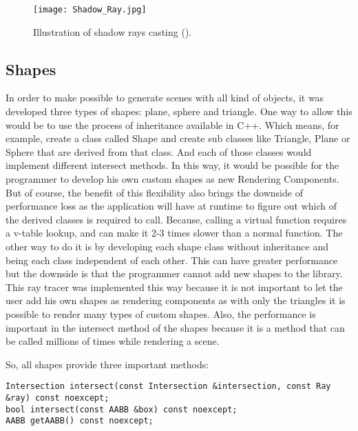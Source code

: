\begin{figure}[H]
	\centering
	\caption{Illustration of shadow rays casting (\cite{ShadowRays}).}
	\label{Illustration of shadow rays casting.}
	\texttt{[image: Shadow\_Ray.jpg]}
\end{figure}


\subsection{Shapes}

\par
In order to make possible to generate scenes with all kind of objects, it was developed three types of shapes: plane, sphere and triangle.
One way to allow this would be to use the process of inheritance available in C++.
Which means, for example, create a class called Shape and create sub classes like Triangle, Plane or Sphere that are derived from that class.
And each of those classes would implement different intersect methods.
In this way, it would be possible for the programmer to develop his own custom shapes as new Rendering Components.
But of course, the benefit of this flexibility also brings the downside of performance loss as the application will have at runtime to figure out which of the derived classes is required to call.
Because, calling a virtual function requires a v-table lookup, and can make it 2-3 times slower than a normal function.
The other way to do it is by developing each shape class without inheritance and being each class independent of each other.
This can have greater performance but the downside is that the programmer cannot add new shapes to the library.
This ray tracer was implemented this way because it is not important to let the user add his own shapes as rendering components as with only the triangles it is possible to render many types of custom shapes.
Also, the performance is important in the intersect method of the shapes because it is a method that can be called millions of times while rendering a scene.

So, all shapes provide three important methods:

\begin{lstlisting}[caption={Main methods in Shape}, captionpos=b, label=Shape]
Intersection intersect(const Intersection &intersection, const Ray &ray) const noexcept;
bool intersect(const AABB &box) const noexcept;
AABB getAABB() const noexcept;
\end{lstlisting}

